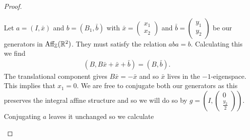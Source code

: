 \begin{proof}
    \begin{case}[$A=I$, $B=B_1$]
        Let $a=(I, \bar{x})$ and $b = (B_1, \bar{b})$ with $\bar{x} = \begin{pmatrix}
                x_1 \\ x_2
            \end{pmatrix}$ and $\bar{b} = \begin{pmatrix}
                y_1 \\ y_2
            \end{pmatrix}$ be our generators in $\text{Aff}_{\mathbb{Z}}(\mathbb{R}^2)$. They must satisfy the relation $aba = b$. Calculating this we find
        \begin{align*}
            (B, B\bar{x} +\bar{x} + \bar{b}) = (B, \bar{b}).
        \end{align*}
        The translational component gives $B\bar{x} = - \bar{x}$ and so $\bar{x}$ lives in the $-1$-eigenspace. This implies that $x_1=0$. We are free to conjugate both our generators as this preserves the integral affine structure
        and so we will do so by $g= \left(I, \begin{pmatrix}
                    0 \\ \frac{y_2}{2}
                \end{pmatrix}\right)$. Conjugating $a$ leaves it unchanged so we calculate


\end{case}
\end{proof}
